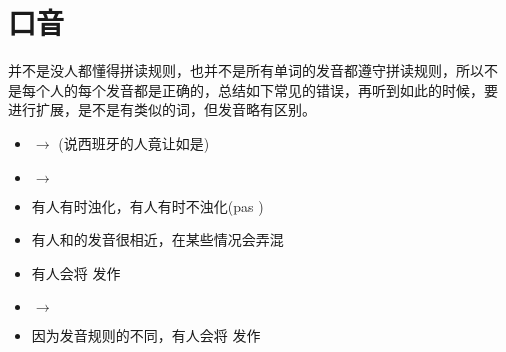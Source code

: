 
\chapter{口音}

并不是没人都懂得拼读规则，也并不是所有单词的发音都遵守拼读规则，所以不
是每个人的每个发音都是正确的，总结如下常见的错误，再听到如此的时候，要
进行扩展，是不是有类似的词，但发音略有区别。

\begin{itemize}
\item \textipa{[y]} $\rightarrow$ \textipa{[u]} (说西班牙的人竟让如是)
\item \textipa{[@],[E]} $\rightarrow$ \textipa{[E]}
\item 有人有时浊化，有人有时不浊化(pas \textipa{[pa], [ba]})
\item 有人\textipa{[E]}和\textipa{[e]}的发音很相近，在某些情况会弄混
\item 有人会将\textipa{[E]} 发作 \textipa{[i]}
\item \textipa{[\oe]} $\rightarrow$ \textipa{[@]}
\item 因为发音规则的不同，有人会将\textipa{[\~a]} 发作 \textipa{[\~E]}
\end{itemize}

